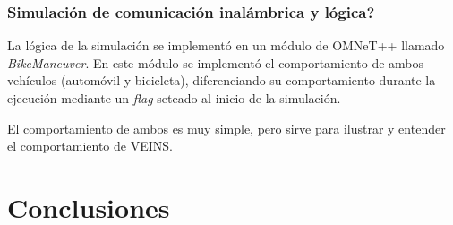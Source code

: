 \documentclass[11pt,letterpaper]{article}
\begin{document}
\subsubsection{Simulación de comunicación inalámbrica y lógica?}\label{section:prot_communication}

La lógica de la simulación se implementó en un módulo de OMNeT++ llamado \emph{BikeManeuver}. En este módulo se implementó el comportamiento de ambos vehículos (automóvil y bicicleta), diferenciando su comportamiento durante la ejecución mediante un \emph{flag} seteado al inicio de la simulación.

El comportamiento de ambos es muy simple, pero sirve para ilustrar y entender el comportamiento de VEINS.



\newpage
\section{Conclusiones}
\newpage
\end{document}
